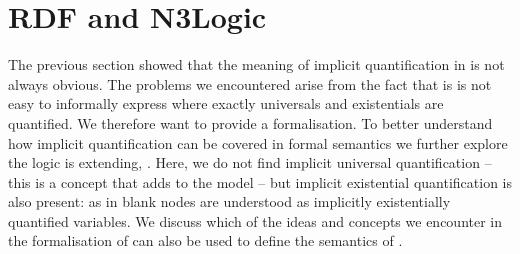 \section{RDF and N3Logic}
The previous section showed that the meaning of implicit quantification in \nthree is not always obvious. The problems we encountered arise from the fact 
that is is not easy to informally express where exactly universals and existentials are quantified. We therefore want to provide a formalisation.
To better understand how implicit quantification can be covered in formal semantics we further explore 
 the logic \nthree is extending, \rdf. Here, we do not find implicit universal quantification -- this is a concept that \nthreelogic adds to the \rdf 
model -- but implicit existential quantification 
is also present: as in \nthree blank nodes are understood as implicitly existentially quantified variables.
%
We discuss which of the ideas and concepts we encounter in the formalisation of \rdf can also be used to define the semantics of \nthreelogic.

